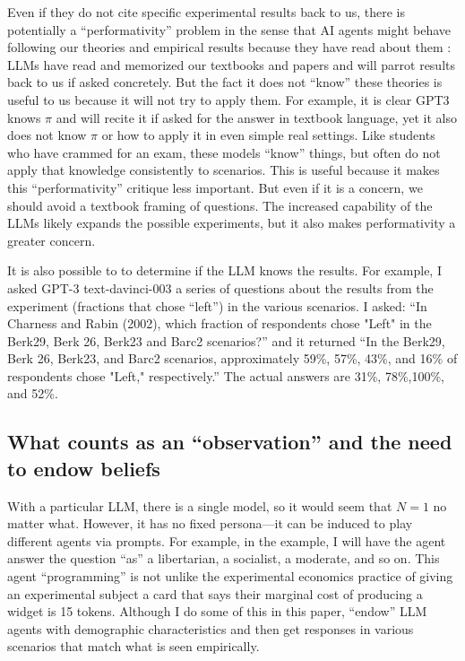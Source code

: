 \documentclass[11pt]{article}
\begin{document}
Even if they do not cite specific experimental results back to us, there is potentially a ``performativity'' problem in the sense that AI agents might behave following our theories and empirical results because they have read about them \citep{perfomativity2007}:
LLMs have read and memorized our textbooks and papers and will parrot results back to us if asked concretely.
But the fact it does not ``know'' these theories is useful to us because it will not try to apply them.   
For example, it is clear GPT3 knows $\pi$ and will recite it if asked for the answer in textbook language, yet it also does not know $\pi$ or how to apply it in even simple real settings.
Like students who have crammed for an exam, these models ``know'' things, but often do not apply that knowledge consistently to scenarios.
This is useful because it makes this ``performativity'' critique less important.
But even if it is a concern, we should avoid a textbook framing of questions.
The increased capability of the LLMs likely expands the possible experiments, but it also makes performativity a greater concern.

It is also possible to to determine if the LLM knows the results.
For example, I asked GPT-3 text-davinci-003 a series of questions about the results from the \cite{charness2002understanding} experiment (fractions that chose ``left'') in the various scenarios.
I asked: ``In Charness and Rabin (2002), which fraction of respondents chose "Left" in the Berk29, Berk 26, Berk23 and Barc2 scenarios?'' and it returned ``In the Berk29, Berk 26, Berk23, and Barc2 scenarios, approximately 59\%, 57\%, 43\%, and 16\% of respondents chose "Left," respectively.''
The actual answers are 31\%, 78\%,100\%, and 52\%.

\subsection{What counts as an ``observation'' and the need to endow beliefs}
With a particular LLM, there is a single model, so it would seem that $N = 1$ no matter what. 
However, it has no fixed persona---it can be induced to play different agents via prompts.
For example, in the \cite{kahneman1986fairness} example, I will have the agent answer the question ``as'' a libertarian, a socialist, a moderate, and so on.
This agent ``programming'' is not unlike the experimental economics practice of giving an experimental subject a card that says their marginal cost of producing a widget is 15 tokens.
Although I do some of this in this paper, \cite{argyle2022out} ``endow'' LLM agents with demographic characteristics and then get responses in various scenarios that match what is seen empirically. 
\end{document}

